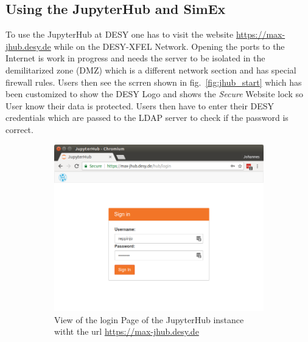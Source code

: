 \documentclass[10pt]{scrartcl}
\begin{document}
\subsection{Using the JupyterHub and SimEx}
To use the JupyterHub at DESY one has to visit the website
\url{https://max-jhub.desy.de} while on the DESY-XFEL Network.
Opening the ports to the Internet is work in progress and needs the server to be isolated in the demilitarized zone (DMZ) which is a different network section and has special firewall rules.
Users then see the scrren shown in fig.~\ref{fig:jhub_start} which has been customized to show the DESY Logo and shows the \textit{Secure} Website lock so User know their data is protected.
Users then have to enter their DESY credentials which are passed to the LDAP server to check if the password is correct.
%
\begin{figure}
  \centering
  \begin{subfigure}{0.45\textwidth} %
	  \includegraphics[width=\textwidth]{figures/jhub001.png}
	  \caption{View of the login Page of the JupyterHub instance witht the url
        \url{https://max-jhub.desy.de}} %
  \end{subfigure}
  \vspace{1em} %
  \begin{subfigure}{0.45\textwidth} %

\end{subfigure}
\end{figure}
\end{document}
